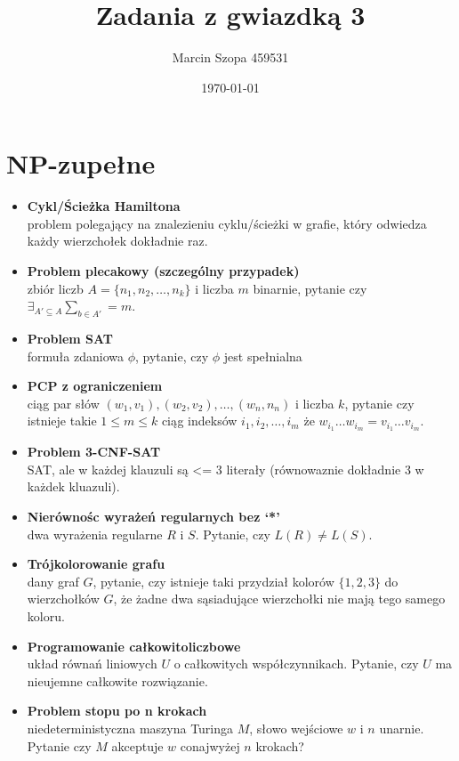 \documentclass{article}
\title{Zadania z gwiazdką 3}
\author{Marcin Szopa 459531}
\date{\today}
\theoremstyle{definition}
\theoremstyle{remark}
\begin{document}
\section{NP-zupełne}

\begin{itemize}
    \item \textbf{Cykl/Ścieżka Hamiltona} \\
    problem polegający na znalezieniu cyklu/ścieżki w grafie, który odwiedza każdy wierzchołek dokładnie raz.
    
    \item \textbf{Problem plecakowy (szczególny przypadek)} \\
    zbiór liczb $A=\{n_1,n_2,\ldots,n_k\}$ i liczba $m$ binarnie, pytanie czy $\exists_{A' \subseteq A} \sum_{b \in A'}= m$.
    
    \item \textbf{Problem SAT} \\
    formuła zdaniowa $\phi$, pytanie, czy $\phi$ jest spełnialna

    \item \textbf{PCP z ograniczeniem} \\
    ciąg par słów $(w_1, v_1), (w_2, v_2), \ldots, (w_n, n_n)$ i liczba $k$,
     pytanie czy istnieje takie $1 \leq m \leq k$ ciąg indeksów $i_1, i_2, \ldots, i_m$ że $ w_{i_1} \ldots w_{i_m} = v_{i_1} \ldots v_{i_m}$.

    \item \textbf{Problem 3-CNF-SAT} \\
    SAT, ale w każdej klauzuli są <= 3 literały (równowaznie dokładnie 3 w każdek kluazuli).
    
    \item \textbf{Nierównośc wyrażeń regularnych bez `*'} \\
    dwa wyrażenia regularne $R$ i $S$. Pytanie, czy $L(R) \neq L(S)$.

    \newpage
    \item \textbf{Trójkolorowanie grafu} \\
    dany graf $G$, pytanie, czy istnieje taki przydział kolorów $\{1,2,3\}$ do wierzchołków $G$, że żadne dwa sąsiadujące wierzchołki nie mają tego samego koloru.
    
    \item \textbf{Programowanie całkowitoliczbowe} \\
    układ równań liniowych $U$ o całkowitych współczynnikach. Pytanie, czy $U$ ma nieujemne całkowite rozwiązanie.
    
    \newpage
    \item \textbf{Problem stopu po n krokach} \\
    niedeterministyczna maszyna Turinga $M$, słowo wejściowe $w$ i $n$ unarnie. Pytanie czy $M$ akceptuje $w$ conajwyżej $n$ krokach?
\end{itemize}
\end{document}
